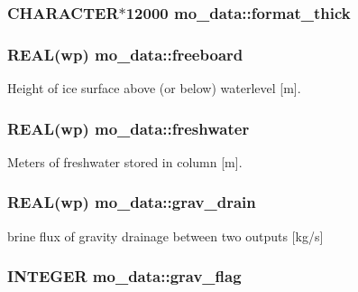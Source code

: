\label{namespacemo__data_a15b8dd299b9b9a34d337f74ea3e8b676}
\hypertarget{namespacemo__data_acb2cd425e31735f68ad118da5eed1392}{
\subsubsection[{format\_\-thick}]{\setlength{\rightskip}{0pt plus 5cm}CHARACTER$\ast$12000 {\bf mo\_\-data::format\_\-thick}}}
\label{namespacemo__data_acb2cd425e31735f68ad118da5eed1392}
\hypertarget{namespacemo__data_aef61c6317d4baba778438cea10b64412}{
\subsubsection[{freeboard}]{\setlength{\rightskip}{0pt plus 5cm}REAL(wp) {\bf mo\_\-data::freeboard}}}
\label{namespacemo__data_aef61c6317d4baba778438cea10b64412}


Height of ice surface above (or below) waterlevel \mbox{[}m\mbox{]}. 

\hypertarget{namespacemo__data_a4c81fc09918e52dc51dfa99efbbac90b}{
\subsubsection[{freshwater}]{\setlength{\rightskip}{0pt plus 5cm}REAL(wp) {\bf mo\_\-data::freshwater}}}
\label{namespacemo__data_a4c81fc09918e52dc51dfa99efbbac90b}


Meters of freshwater stored in column \mbox{[}m\mbox{]}. 

\hypertarget{namespacemo__data_a7971f5dbfdde936f63647492b31dffe9}{
\subsubsection[{grav\_\-drain}]{\setlength{\rightskip}{0pt plus 5cm}REAL(wp) {\bf mo\_\-data::grav\_\-drain}}}
\label{namespacemo__data_a7971f5dbfdde936f63647492b31dffe9}


brine flux of gravity drainage between two outputs \mbox{[}kg/s\mbox{]} 

\hypertarget{namespacemo__data_ac9c9cead6d68b7413f41e70c9038e9c7}{
\subsubsection[{grav\_\-flag}]{\setlength{\rightskip}{0pt plus 5cm}INTEGER {\bf mo\_\-data::grav\_\-flag}}}
\label{namespacemo__data_ac9c9cead6d68b7413f41e70c9038e9c7}


